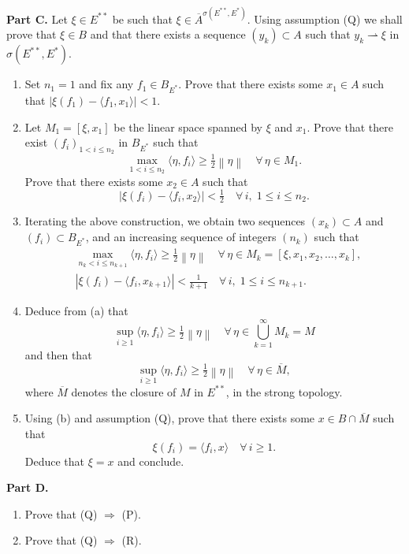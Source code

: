 \documentclass[12pt]{article}
\newcommand{\norm}[1]{\left\|#1\right\|}
\newcommand{\abs}[1]{\left|#1\right|}
\newcommand{\ip}[2]{\langle #1, #2 \rangle}
\begin{document}
\noindent\textbf{Part C.} Let $\xi \in E^{**}$ be such that $\xi \in \overline{A}^{\sigma(E^{**},E^*)}$.
Using assumption (Q) we shall prove that $\xi \in B$ and that there exists a sequence
$(y_k) \subset A$ such that $y_k \rightharpoonup \xi$ in $\sigma(E^{**}, E^*)$.

\begin{enumerate}
\item Set $n_1 = 1$ and fix any $f_1 \in B_{E^*}$. Prove that there exists some $x_1 \in A$ such
that $\abs{\xi(f_1) - \ip{f_1}{x_1}} < 1$.

\item Let $M_1 = [\xi, x_1]$ be the linear space spanned by $\xi$ and $x_1$. Prove that there exist
$(f_i)_{1 < i \le n_2}$ in $B_{E^*}$ such that
\[
\max_{1 < i \le n_2} \ip{\eta}{f_i} \ge \tfrac{1}{2}\norm{\eta} \quad \forall\, \eta \in M_1.
\]
Prove that there exists some $x_2 \in A$ such that
\[
\abs{\xi(f_i) - \ip{f_i}{x_2}} < \tfrac{1}{2} \quad \forall\, i,\; 1 \le i \le n_2.
\]

\item Iterating the above construction, we obtain two sequences $(x_k) \subset A$ and
$(f_i) \subset B_{E^*}$, and an increasing sequence of integers $(n_k)$ such that
\begin{align*}
&\max_{n_k < i \le n_{k+1}} \ip{\eta}{f_i} \ge \tfrac{1}{2}\norm{\eta}
\quad \forall\, \eta \in M_k = [\xi, x_1, x_2, \ldots, x_k], \tag{a}\\
&\abs{\xi(f_i) - \ip{f_i}{x_{k+1}}} < \tfrac{1}{k+1}
\quad \forall\, i,\; 1 \le i \le n_{k+1}. \tag{b}
\end{align*}

\item Deduce from (a) that
\[
\sup_{i \ge 1} \ip{\eta}{f_i} \ge \tfrac{1}{2}\norm{\eta} \quad \forall\, \eta \in \bigcup_{k=1}^\infty M_k = M
\]
and then that
\[
\sup_{i \ge 1} \ip{\eta}{f_i} \ge \tfrac{1}{2}\norm{\eta} \quad \forall\, \eta \in \overline{M},
\]
where $\overline{M}$ denotes the closure of $M$ in $E^{**}$, in the strong topology.

\item Using (b) and assumption (Q), prove that there exists some $x \in B \cap \overline{M}$ such that
\[
\xi(f_i) = \ip{f_i}{x} \quad \forall\, i \ge 1.
\]
Deduce that $\xi = x$ and conclude.
\end{enumerate}

\noindent\textbf{Part D.}

\begin{enumerate}
\item Prove that (Q) $\Rightarrow$ (P).
\item Prove that (Q) $\Rightarrow$ (R).
\end{enumerate}
\end{document}
